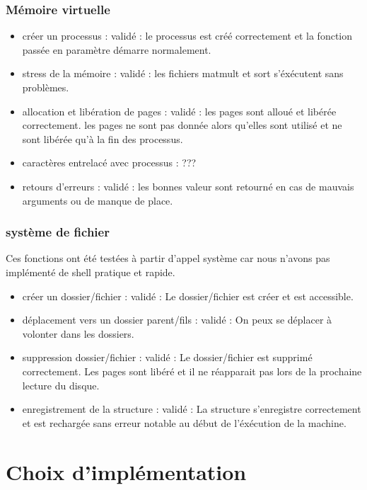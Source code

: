 \documentclass{article}
\begin{document}
		\subsubsection{Mémoire virtuelle}
			\begin{itemize}
				\item créer un processus :					validé : le processus est créé correctement et la fonction passée en paramètre démarre normalement.
				\item stress de la mémoire :				validé : les fichiers matmult et sort s'éxécutent sans problèmes.
				\item allocation et libération de pages : 	validé : les pages sont alloué et libérée correctement. les pages ne sont pas donnée alors qu'elles sont utilisé et ne sont libérée qu'à la fin des processus.
				\item caractères entrelacé avec processus : ???
				\item retours d'erreurs : 					validé : les bonnes valeur sont retourné en cas de mauvais arguments ou de manque de place.
			\end{itemize}

		\subsubsection{système de fichier}
		Ces fonctions ont été testées à partir d'appel système car nous n'avons pas implémenté de shell pratique et rapide.
			\begin{itemize}
				\item créer un dossier/fichier :				validé : Le dossier/fichier est créer et est accessible.
				\item déplacement vers un dossier parent/fils :	validé : On peux se déplacer à volonter dans les dossiers.
				\item suppression dossier/fichier :				validé : Le dossier/fichier est supprimé correctement. Les pages sont libéré et il ne réapparait pas lors de la prochaine lecture du disque.
				\item enregistrement de la structure :			validé : La structure s'enregistre correctement et est rechargée sans erreur notable au début de l'éxécution de la machine.
			\end{itemize}

\section{Choix d'implémentation}
\end{document}
